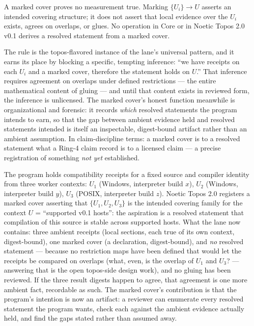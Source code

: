 \begin{ruleenv}\label{integ:rule:cover}
A marked cover proves no measurement true. Marking $\{U_i\} \to U$ asserts an intended covering structure; it does not assert that local evidence over the $U_i$ exists, agrees on overlaps, or glues. No operation in Core or in Noetic Topos 2.0 v0.1 derives a resolved statement from a marked cover.
\end{ruleenv}

The rule is the topos-flavored instance of the lane's universal pattern, and it earns its place by blocking a specific, tempting inference: ``we have receipts on each $U_i$ and a marked cover, therefore the statement holds on $U$.'' That inference requires agreement on overlaps under defined restrictions --- the entire mathematical content of gluing --- and until that content exists in reviewed form, the inference is unlicensed. The marked cover's honest function meanwhile is organizational and forensic: it records \emph{which} resolved statements the program intends to earn, so that the gap between ambient evidence held and resolved statements intended is itself an inspectable, digest-bound artifact rather than an ambient assumption. In claim-discipline terms: a marked cover is to a resolved statement what a Ring-4 claim record is to a licensed claim --- a precise registration of something \emph{not yet} established.

\begin{example}\label{integ:ex:topos}
The program holds compatibility receipts for a fixed source and compiler identity from three worker contexts: $U_1$ (Windows, interpreter build $x$), $U_2$ (Windows, interpreter build $y$), $U_3$ (POSIX, interpreter build $z$). Noetic Topos 2.0 registers a marked cover asserting that $\{U_1, U_2, U_3\}$ is the intended covering family for the context $U$ = ``supported v0.1 hosts'': the aspiration is a resolved statement that compilation of this source is stable across supported hosts. What the lane now contains: three ambient receipts (local sections, each true of its own context, digest-bound), one marked cover (a declaration, digest-bound), and \emph{no} resolved statement --- because no restriction maps have been defined that would let the receipts be compared on overlaps (what, even, is the overlap of $U_1$ and $U_3$? --- answering that is the open topos-side design work), and no gluing has been reviewed. If the three result digests happen to agree, that agreement is one more ambient fact, recordable as such. The marked cover's contribution is that the program's intention is now an artifact: a reviewer can enumerate every resolved statement the program wants, check each against the ambient evidence actually held, and find the gaps stated rather than assumed away.
\end{example}

